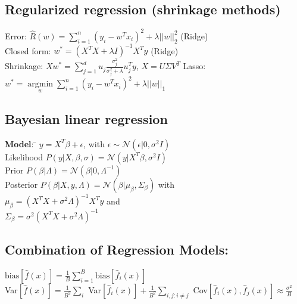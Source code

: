 \subsection*{Regularized regression (shrinkage methods)}
Error: $\hat{R}(w) = \sum \limits_{i=1}^n (y_i - w^Tx_i)^2 + \lambda ||w||_2^2$ (Ridge) \\
Closed form: $w^*=(X^T X + \lambda I)^{-1} X^T y$ (Ridge)\\
{\small{} Shrinkage:} $Xw^*{=}\sum_{j=1}^{d} u_j\frac{\sigma_j^2}{\sigma_j^2+\lambda}u_j^Ty$, $X{=}U\Sigma V^T$ 
Lasso: $w^* = \underset{w}{\operatorname{argmin}} \sum \limits_{i=1}^n (y_i - w^Tx_i)^2 + \lambda ||w||_1$

\subsection*{Bayesian linear regression}
	\textbf{Model}:  \= $y = X^T \beta + \epsilon$, with $\epsilon \sim
	\mathcal{N}(\epsilon | 0, \sigma^2 I)$\\ 
	Likelihood $P(y | X, \beta, \sigma) = \mathcal{N}(y | X^T \beta , \sigma^2 I)$\\
	Prior $P(\beta | \Lambda) = \mathcal{N} (\beta | 0, \Lambda^{-1})$\\ Posterior $P(\beta | X, y, \Lambda) = \mathcal{N}(\beta | \mu_\beta, \Sigma_\beta)$ with \\
	$\mu_\beta = (X^T X + \sigma^2 \Lambda)^{-1} X^T y$ and \\
	$\Sigma_\beta = \sigma^2(X^T X + \sigma^2 \Lambda)^{-1}$ \\

\subsection*{Combination of Regression Models:}
$\text{bias}[\hat{f}(x)] = \frac{1}{B} \sum_{i=1}^{B} \text{bias}[\hat{f}_i(x)]$\\
Var$[\hat{f}(x)] = \frac{1}{B^2}\sum_i$ Var$[\hat{f}_i(x)]
+ \frac{1}{B^2}\sum_{i,j:i\neq j}$ Cov$[\hat{f}_i(x), \hat{f}_j(x)] \approx \frac{\sigma^2}{B}$

